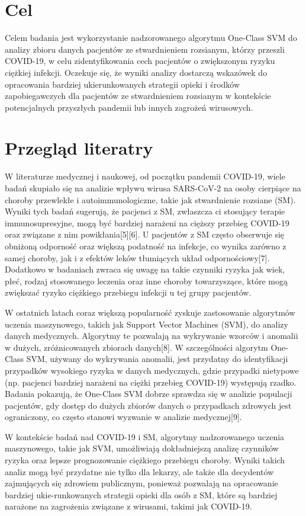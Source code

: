 \documentclass[a4paper,fleqn]{cas-dc}
\begin{document}
\section{Cel}
Celem badania jest wykorzystanie nadzorowanego algorytmu One-Class SVM do analizy zbioru danych pacjentów ze stwardnieniem rozsianym, którzy przeszli COVID-19, w celu zidentyfikowania cech pacjentów o zwiększonym ryzyku ciężkiej infekcji. Oczekuje się, że wyniki analizy dostarczą wskazówek do opracowania bardziej ukierunkowanych strategii opieki i środków zapobiegawczych dla pacjentów ze stwardnieniem rozsianym w kontekście potencjalnych przyszłych pandemii lub innych zagrożeń wirusowych.

\section{Przegląd literatry}
W literaturze medycznej i naukowej, od początku pandemii COVID-19, wiele badań skupiało się na analizie wpływu wirusa SARS-CoV-2 na osoby cierpiące na choroby przewlekłe i autoimmunologiczne, takie jak stwardnienie rozsiane (SM). Wyniki tych badań sugerują, że pacjenci z SM, zwłaszcza ci stosujący terapie immunosupresyjne, mogą być bardziej narażeni na cięższy przebieg COVID-19 oraz związane z nim powikłania[5][6]. U pacjentów z SM często obserwuje się obniżoną odporność oraz większą podatność na infekcje, co wynika zarówno z samej choroby, jak i z efektów leków tłumiących układ odpornościowy[7]. Dodatkowo w badaniach zwraca się uwagę na takie czynniki ryzyka jak wiek, płeć, rodzaj stosowanego leczenia oraz inne choroby towarzyszące, które mogą zwiększać ryzyko ciężkiego przebiegu infekcji u tej grupy pacjentów.

W ostatnich latach coraz większą popularność zyskuje zastosowanie algorytmów uczenia maszynowego, takich jak Support Vector Machines (SVM), do analizy danych medycznych. Algorytmy te pozwalają na wykrywanie wzorców i anomalii w dużych, zróżnicowanych zbiorach danych[8]. W szczególności algorytm One-Class SVM, używany do wykrywania anomalii, jest przydatny do identyfikacji przypadków wysokiego ryzyka w danych medycznych, gdzie przypadki nietypowe (np. pacjenci bardziej narażeni na ciężki przebieg COVID-19) występują rzadko. Badania pokazują, że One-Class SVM dobrze sprawdza się w analizie populacji pacjentów, gdy dostęp do dużych zbiorów danych o przypadkach zdrowych jest ograniczony, co często stanowi wyzwanie w analizie medycznej[9].

W kontekście badań nad COVID-19 i SM, algorytmy nadzorowanego uczenia maszynowego, takie jak SVM, umożliwiają dokładniejszą analizę czynników ryzyka oraz lepsze prognozowanie ciężkiego przebiegu choroby. Wyniki takich analiz mogą być przydatne nie tylko dla lekarzy, ale także dla decydentów zajmujących się zdrowiem publicznym, ponieważ pozwalają na opracowanie bardziej ukie-runkowanych strategii opieki dla osób z SM, które są bardziej narażone na zagrożenia związane z wirusami, takimi jak COVID-19.
\end{document}
